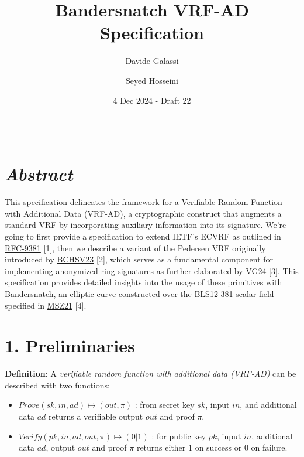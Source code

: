 \documentclass[
]{article}
\title{Bandersnatch VRF-AD Specification}
\author{Davide Galassi \and Seyed Hosseini}
\date{4 Dec 2024 - Draft 22}
\begin{document}
\maketitle

\newcommand{\G}{\langle G \rangle}
\newcommand{\F}{\mathbb{Z}^*_r}

\begin{center}\rule{0.5\linewidth}{0.5pt}\end{center}

\hypertarget{abstract}{%
\section{\texorpdfstring{\emph{Abstract}}{Abstract}}\label{abstract}}

This specification delineates the framework for a Verifiable Random
Function with Additional Data (VRF-AD), a cryptographic construct that
augments a standard VRF by incorporating auxiliary information into its
signature. We're going to first provide a specification to extend IETF's
ECVRF as outlined in
\href{https://datatracker.ietf.org/doc/rfc9381}{RFC-9381} {[}1{]}, then
we describe a variant of the Pedersen VRF originally introduced by
\href{https://eprint.iacr.org/2023/002}{BCHSV23} {[}2{]}, which serves
as a fundamental component for implementing anonymized ring signatures
as further elaborated by
\href{https://github.com/davxy/ring-proof-spec}{VG24} {[}3{]}. This
specification provides detailed insights into the usage of these
primitives with Bandersnatch, an elliptic curve constructed over the
BLS12-381 scalar field specified in
\href{https://eprint.iacr.org/2021/1152}{MSZ21} {[}4{]}.

\hypertarget{preliminaries}{%
\section{1. Preliminaries}\label{preliminaries}}

\textbf{Definition}: A \emph{verifiable random function with additional
data (VRF-AD)} can be described with two functions:

\begin{itemize}
\item
  \(Prove(sk,in,ad) \mapsto (out,\pi)\) : from secret key \(sk\), input
  \(in\), and additional data \(ad\) returns a verifiable output \(out\)
  and proof \(\pi\).
\item
  \(Verify(pk,in,ad,out,\pi) \mapsto (0|1)\) : for public key \(pk\),
  input \(in\), additional data \(ad\), output \(out\) and proof \(\pi\)
  returns either \(1\) on success or \(0\) on failure.
\end{itemize}
\end{document}
